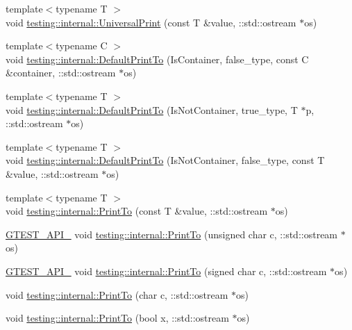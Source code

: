 \begin{DoxyCompactItemize}
\item 
{\footnotesize template$<$typename T $>$ }\\void \hyperlink{namespacetesting_1_1internal_a30708fa2bacf11895b03bdb21eb72309}{testing\+::internal\+::\+Universal\+Print} (const T \&value, \+::std\+::ostream $\ast$os)
\item 
{\footnotesize template$<$typename C $>$ }\\void \hyperlink{namespacetesting_1_1internal_ac7dfe02c4c1cbfe89c23a93d873079c5}{testing\+::internal\+::\+Default\+Print\+To} (Is\+Container, false\+\_\+type, const C \&container, \+::std\+::ostream $\ast$os)
\item 
{\footnotesize template$<$typename T $>$ }\\void \hyperlink{namespacetesting_1_1internal_affa1f94e3ba8db8b964553c2871bf339}{testing\+::internal\+::\+Default\+Print\+To} (Is\+Not\+Container, true\+\_\+type, T $\ast$p, \+::std\+::ostream $\ast$os)
\item 
{\footnotesize template$<$typename T $>$ }\\void \hyperlink{namespacetesting_1_1internal_a78e4937ba564f01dac2ff25f3eece0ec}{testing\+::internal\+::\+Default\+Print\+To} (Is\+Not\+Container, false\+\_\+type, const T \&value, \+::std\+::ostream $\ast$os)
\item 
{\footnotesize template$<$typename T $>$ }\\void \hyperlink{namespacetesting_1_1internal_adb3c27150dbe661db0e0c4be27533460}{testing\+::internal\+::\+Print\+To} (const T \&value, \+::std\+::ostream $\ast$os)
\item 
\hyperlink{gtest-port_8h_aa73be6f0ba4a7456180a94904ce17790}{G\+T\+E\+S\+T\+\_\+\+A\+P\+I\+\_\+} void \hyperlink{namespacetesting_1_1internal_ab7524d6d3ab8c31b1deea88bf61783bb}{testing\+::internal\+::\+Print\+To} (unsigned char c, \+::std\+::ostream $\ast$os)
\item 
\hyperlink{gtest-port_8h_aa73be6f0ba4a7456180a94904ce17790}{G\+T\+E\+S\+T\+\_\+\+A\+P\+I\+\_\+} void \hyperlink{namespacetesting_1_1internal_ad453af399370e394881079c243abacb4}{testing\+::internal\+::\+Print\+To} (signed char c, \+::std\+::ostream $\ast$os)
\item 
void \hyperlink{namespacetesting_1_1internal_a476bd3d411d4f129620aaf8999c257c0}{testing\+::internal\+::\+Print\+To} (char c, \+::std\+::ostream $\ast$os)
\item 
void \hyperlink{namespacetesting_1_1internal_a2979ac1ad3e05c51dcd7dca2eb34e6ce}{testing\+::internal\+::\+Print\+To} (bool x, \+::std\+::ostream $\ast$os)

\end{DoxyCompactItemize}
